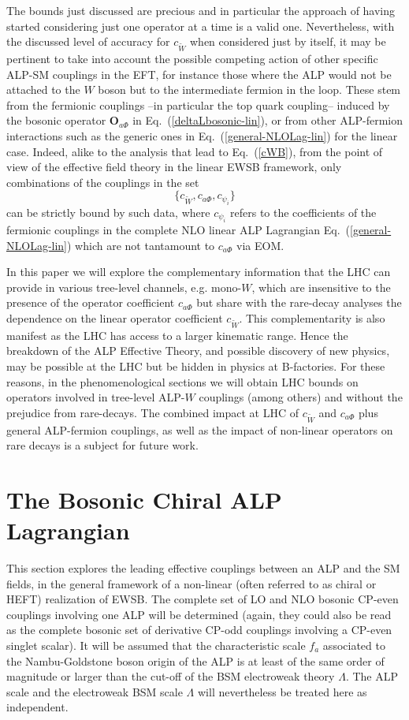 \documentclass[11pt]{article}
\renewcommand{\O}{\mathbf{O}}
\newcommand{\beq}{\begin{equation}}
\newcommand{\eeq}{\end{equation}}
\renewcommand{\[}{\begin{equation}}
\renewcommand{\]}{\end{equation}}
\begin{document}
The bounds just discussed are precious and in particular the approach of having started considering just one operator at a time is a valid one. Nevertheless, 
with the discussed level of accuracy for $c_{\tilde W}$ when considered just by itself, it may be pertinent to take into account 
the possible competing action of other specific ALP-SM couplings in the EFT, for instance those  where the ALP would not be attached to the $W$ boson but to the intermediate fermion in the loop. These stem from the fermionic couplings  --in particular the top quark coupling-- induced by the bosonic operator $\O_{a\Phi}$ in Eq.~(\ref{deltaLbosonic-lin}), or from other ALP-fermion interactions such as the generic ones in Eq.~(\ref{general-NLOLag-lin}) for the linear case. Indeed,  alike to the analysis that lead to Eq.~(\ref{cWB}), from the point of view of the effective field theory in the linear EWSB framework, only combinations of the couplings in the set
\beq
\{c_{\tilde W}, c_{a \Phi},c_{\psi_i}\}
\eeq 
can  be strictly bound by such data,  where $c_{\psi_i}$ refers to the coefficients of the fermionic couplings in the complete NLO 
linear ALP Lagrangian Eq.~(\ref{general-NLOLag-lin}) which are not tantamount to $c_{a \Phi}$ via EOM. 

In this paper we will explore the complementary information that the LHC can provide in various tree-level channels, 
e.g. mono-$W$, which are insensitive to the presence of the operator coefficient $c_{a\Phi}$ but share with the rare-decay analyses 
the dependence on the linear operator coefficient $c_{\tilde W}$.
This complementarity is also manifest as the LHC has access to a larger kinematic range. Hence the breakdown of the ALP Effective Theory, 
and possible discovery of new physics, may be possible at the LHC but be hidden in physics at B-factories. For these reasons, 
in the phenomenological sections we will obtain LHC bounds on operators involved in tree-level ALP-$W$ couplings (among others) and 
without the prejudice from rare-decays. The combined impact at LHC of $c_{\tilde W}$ and $c_{a\Phi}$ plus general ALP-fermion couplings, 
as well as the impact of non-linear operators on rare decays is a subject for future work.


\vspace{0.5cm}
\section{The Bosonic Chiral ALP Lagrangian} 
\label{Sect:basis}
This section explores the leading effective couplings between an ALP  and the SM fields, in the general framework of a non-linear (often referred to as chiral or HEFT) 
realization of EWSB.   The complete set of LO and NLO bosonic CP-even couplings involving one ALP  will be determined (again, they could also be read as the complete bosonic set of derivative CP-odd couplings involving a CP-even singlet scalar). It will be assumed that the 
characteristic  scale $f_a$  associated to the Nambu-Goldstone boson origin of the ALP  is at least of the same order of magnitude or larger than the cut-off of the 
BSM electroweak theory $\Lambda$. The ALP scale and the electroweak BSM scale $\Lambda$ will nevertheless be treated here as independent.
\end{document}
